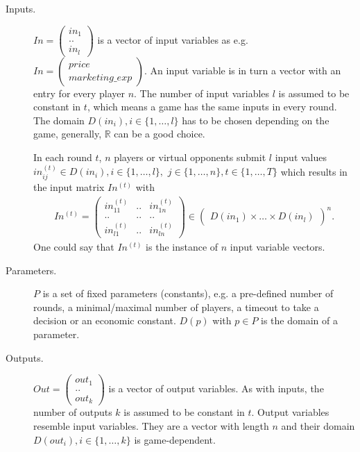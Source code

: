 \begin{description}
    \item[Inputs.] $In = \begin{pmatrix}
        in_1\\..\\in_l
        \end{pmatrix}$
    is a vector of input variables as e.g. $In = \begin{pmatrix}
        price\\marketing\_exp
        \end{pmatrix}$. An input variable is in turn a vector with an entry for every player $n$. The number of input variables $l$ is assumed to be constant in $t$, which means a game has the same inputs in every round. The domain $D(in_i), i \in \{1,\dots,l\}$ has to be chosen depending on the game, generally, $\mathbb{R}$ can be a good choice.
    
    In each round $t$, $n$ players or virtual opponents submit $l$ input values $in_{ij}^{(t)} \in D(in_i), i\in\{1,\dots,l\},$ $j\in\{1,\dots,n\},t\in\{1,\dots,T\}$ which results in the input matrix $In^{(t)}$ with
    \begin{align}
        In^{(t)} = \begin{pmatrix}
        in_{11}^{(t)}&..&in_{1n}^{(t)}\\..&..&..\\in_{l1}^{(t)}&..&in_{ln}^{(t)}
        \end{pmatrix} \in \begin{pmatrix}
        D(in_1) \times \dots \times D(in_l)
        \end{pmatrix}^n. 
    \end{align}
    One could say that $In^{(t)}$ is the instance of $n$ input variable vectors.
    \item[Parameters.] $P$ is a set of fixed parameters (constants), e.g. a pre-defined number of rounds, a minimal/maximal number of players, a timeout to take a decision or an economic constant. $D(p)$ with $p \in P$ is the domain of a parameter.
    \item[Outputs.] $Out = \begin{pmatrix}
        out_1\\..\\out_k
        \end{pmatrix}$
    is a vector of output variables. As with inputs, the number of outputs $k$ is assumed to be constant in $t$. Output variables resemble input variables. They are a vector with length $n$ and their domain $D(out_i),i\in\{1,\dots,k\}$ is game-dependent.
    

\end{description}
